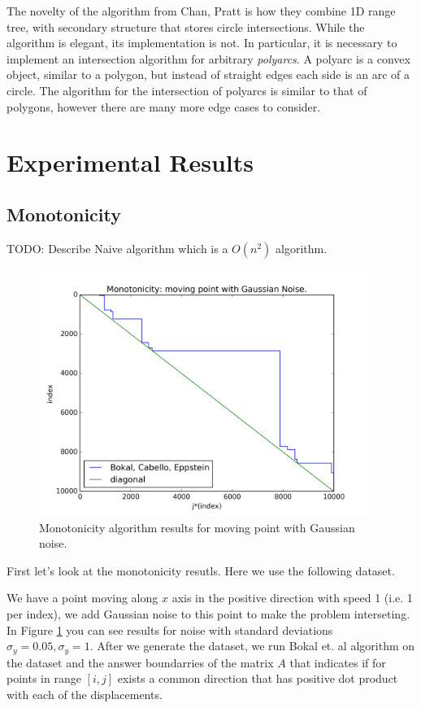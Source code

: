 \documentclass{article}
\begin{document}
The novelty of the algorithm from Chan, Pratt is how they combine 1D range tree, with secondary structure that stores circle intersections. While the algorithm is elegant, its implementation is not. In particular, it is necessary to implement an intersection algorithm for arbitrary \textit{polyarcs}. A polyarc is a convex object, similar to a polygon, but instead of straight edges each side is an arc of a circle. The algorithm for the intersection of polyarcs is similar to that of polygons, however there are many more edge cases to consider.

\section{Experimental Results}

\subsection{Monotonicity}

TODO: Describe Naive algorithm which is a $O(n^2)$ algorithm.

\begin{figure}[!ht]
  \centering
  \includegraphics[height=8cm]{plots/monotonicity_moving_gaussian}
  \caption{Monotonicity algorithm results for moving point with Gaussian noise.}
  \label{fig:monotonicity_demo}
\end{figure}

First let's look at the monotonicity resutls. Here we use the following dataset.

We have a point moving along $x$ axis in the positive direction with speed 1 (i.e. 1 per index), we add Gaussian noise to this point to make the problem interseting. In Figure \ref{fig:monotonicity_demo} you can see results for noise with standard deviations $\sigma_y = 0.05, \sigma_y = 1$. After we generate the dataset, we run Bokal et. al algorithm on the dataset and the answer boundarries of the matrix $A$ that indicates if for points in range $[i, j]$ exists a common direction that has positive dot product with each of the displacements.
\end{document}
